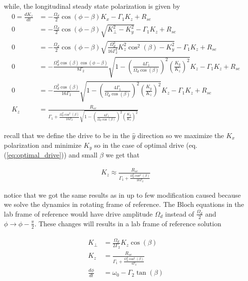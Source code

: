 \documentclass{article}
\begin{document}
while, the longitudinal steady state polarization is given by
\begin{align}
      0=\frac{d K_z}{dt} &=  -\frac{\Omega_d}{2} \cos{\left(\phi-\beta\right)}K_x - \Gamma_1 K_z + R_{se}\\
      0 &=  -\frac{\Omega_d}{2} \cos{\left(\phi-\beta\right)}\sqrt{K_{\perp}^2-K_y^2} - \Gamma_1 K_z + R_{se}\\
      0 &=  -\frac{\Omega_d}{2} \cos{\left(\phi-\beta\right)}\sqrt{\frac{\Omega_d^2}{16\Gamma_2^2} K_z^2 \cos^2{\left(\beta\right)}-K_y^2} - \Gamma_1 K_z + R_{se}\\
      0 &=  -\frac{\Omega_d^2\cos{\left(\beta\right)}\cos{\left(\phi-\beta\right)}}{8\Gamma_2}\sqrt{1 - \left(\frac{4\Gamma_1}{\Omega_d \cos{\left(\beta\right)}}\right)^2\left(\frac{K_y}{K_z}\right)^2}K_z - \Gamma_1 K_z + R_{se}\\
      0 &=  -\frac{\Omega_d^2\cos{\left(\beta\right)}}{16\Gamma_2}\sqrt{1 - \left(\frac{4\Gamma_1}{\Omega_d \cos{\left(\beta\right)}}\right)^2\left(\frac{K_y}{K_z}\right)^2}K_z - \Gamma_1 K_z + R_{se}\\
      K_z &= \frac{R_{se}}{\Gamma_1 + \frac{\Omega_d^2\cos^2{\left(\beta\right)}}{16\Gamma_2}\sqrt{1 - \left(\frac{4\Gamma_1}{\Omega_d \cos{\left(\beta\right)}}\right)^2\left(\frac{K_y}{K_z}\right)^2}}
\end{align}

recall that we define the drive to be in the $\hat{y}$ direction so we maximize the $K_x$ polarization and minimize $K_y$ so in the case of optimal drive (eq.(\ref{eq:optimal_drive})) and small $\beta$ we get that

\begin{align}
      \boxed{K_z \approx \frac{R_{se}}{\Gamma_1 + \frac{\Omega_d^2\cos^2{\left(\beta\right)}}{16\Gamma_2}}}
\end{align}

notice that we got the same results as in \cite{walker2016spin} up to few modification caused because we solve the dynamics in rotating frame of reference. The Bloch equations in the lab frame of reference would have drive amplitude $\Omega_d$ instead of $\frac{\Omega_d}{2}$ and $\phi\to \phi - \frac{\pi}{2}$. These changes will results in a lab frame of reference solution 

\begin{align}
    \boxed{
    \begin{aligned}
       K_{\perp} &= \frac{\Omega_d}{2\Gamma_2} K_z \cos{\left(\beta\right)}\\
      K_z &= \frac{R_{se}}{\Gamma_1 + \frac{\Omega_d^2\cos^2{\left(\beta\right)}}{4\Gamma_2}}\\
      \frac{d \phi}{dt} &=  \omega_0 -\Gamma_2 \tan{\left(\beta\right)}
    \end{aligned}}
\end{align}
\end{document}
